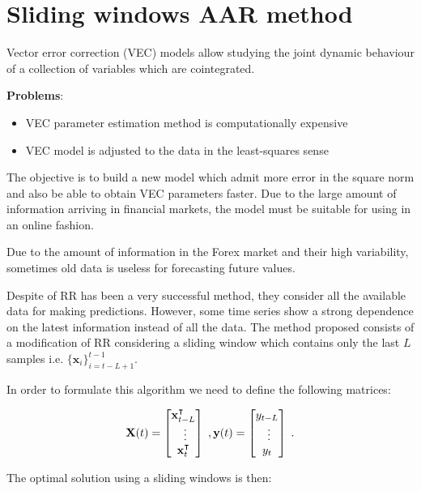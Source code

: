 \section{Sliding windows AAR method} \label{sec:ORR}


Vector error correction (VEC) models allow studying the joint dynamic
behaviour of a collection of variables which are cointegrated. 

\textbf{Problems}: 

\begin{itemize}
\item VEC parameter estimation method is computationally expensive 
\item VEC model is adjusted to the data in the least-squares sense
\end{itemize}

The objective is to build a new model which admit more error in the square norm and
also be able to obtain VEC parameters faster.  Due to the large amount
of information arriving in financial markets, the model must be
suitable for using in an online fashion.


Due to the amount of information in the Forex market and their high
variability, sometimes old data is useless for forecasting future
values. 

Despite of RR has been a very successful method, they consider all
the available data for making predictions. 
However, some time series show a strong dependence on the latest
information instead of all the data.  The method proposed consists of
a modification of RR considering a sliding window which contains only
the last $L$ samples %
i.e. $\{\mathbf{x}_i\}_{i=t-L+1}^{t-1}$. 

In order to formulate this algorithm we need to define the
following matrices:
 
\[
\mathbf{X}(t) = 
\begin{bmatrix} 
\mathbf{x}_{t-L}^\intercal \\ \vdots \\ \mathbf{x}_t^\intercal
\end{bmatrix} \; , 
{\bf y}(t) = \begin{bmatrix} y_{t-L} \\ \vdots \\ y_t \end{bmatrix} \; .
\]

The optimal solution using a sliding windows is then:

